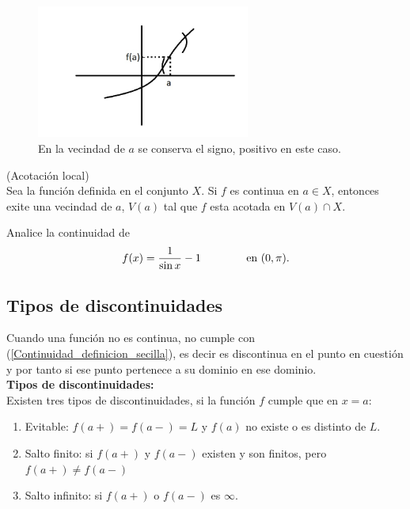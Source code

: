 \documentclass[10pt,twoside]{SelfArx} %
\begin{document}
\begin{figure}[h]
	\centering
	\includegraphics[width=7cm]{Conservacion_signo}
	\caption{En la vecindad de $ a $ se conserva el signo, positivo en este caso.}
	\label{Conservacion_signo}
\end{figure}
\begin{propiedad}
	(Acotación local)\\
	Sea la funci\'on definida en el conjunto $ X $. Si $ f $ es continua en $ a\in X $, entonces exite una vecindad de $ a $, $ V(a) $ tal que $ f $ esta acotada en $ V(a)\cap X $.
\end{propiedad}
\begin{ejemplo}
	Analice la continuidad de
	\[ f(x)=\dfrac{1}{\sin x}-1  \;\;\;\;\;\;\;\;\;\;\;\;\;\;\; \hbox{en $ (0,\pi) $}.\]
\end{ejemplo}




\subsection{Tipos de discontinuidades}
Cuando una función no es continua, no cumple con (\ref{Continuidad_definicion_secilla}), es decir es discontinua en el punto en cuesti\'on y por tanto si ese punto pertenece a su dominio en ese dominio.\\
\textbf{Tipos de discontinuidades:}\\
Existen tres tipos de discontinuidades, si la función $ f $ cumple que en $ x=a $:
\begin{enumerate}
	\item Evitable: $ f(a+)=f(a-)=L $ y $ f(a) $ no existe o es distinto de $ L $.
	\item Salto finito: si $ f(a+) $ y $ f(a-) $ existen y son finitos, pero $ f(a+)\neq f(a-) $
	\item Salto infinito: si $ f(a+) $ o $ f(a-) $ es $ \infty $.
\end{enumerate}
\end{document}
